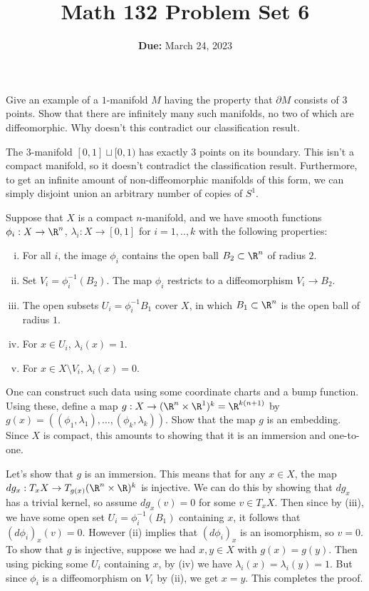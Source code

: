 \documentclass[11pt,letterpaper]{article}
\title{\textbf{Math 132 Problem Set 6}}
\date{\textbf{Due:} March 24, 2023}
\begin{document}
\maketitle

\begin{problem}
    Give an example of a $1$-manifold $M$ having the property that $\partial M$ consists of $3$ points. Show that there are infinitely many such manifolds, no two of which are diffeomorphic. Why doesn't this contradict our classification result.
\end{problem}

\begin{solution}
    \quad The $3$-manifold $[0,1]\sqcup [0, 1)$ has exactly $3$ points on its boundary. This isn't a compact manifold, so it doesn't contradict the classification result. Furthermore, to get an infinite amount of non-diffeomorphic manifolds of this form, we can simply disjoint union an arbitrary number of copies of $S^1$.
\end{solution}

\begin{problem}
    Suppose that $X$ is a compact $n$-manifold, and we have smooth functions $\phi_i : X \to \R^n$, $\lambda_i : X \to [0,1]$ for $i=1,..,k$ with the following properties:
    \begin{enumerate}[(i)]
        \item For all $i$, the image $\phi_i$ contains the open ball $B_2\subset \R^n$ of radius $2$.
        \item Set $V_i = \phi_i^{-1}(B_2)$. The map $\phi_i$ restricts to a diffeomorphism $V_i \to B_2$.
        \item The open subsets $U_i = \phi^{-1}_i B_1$ cover $X$, in which $B_1\subset \R^n$ is the open ball of radius $1$.
        \item For $x\in U_i$, $\lambda_i(x) = 1$.
        \item For $x\in X \setminus V_i$, $\lambda_i(x)=0$.
    \end{enumerate} 
    One can construct such data using some coordinate charts and a bump function. Using these, define a map $g : X \to (\R^n \times \R^1)^k = \R^{k(n+1)}$ by $g(x)=\left((\phi_1, \lambda_1),\ldots,(\phi_k, \lambda_k)\right)$. Show that the map $g$ is an embedding. Since $X$ is compact, this amounts to showing that it is an immersion and one-to-one.
\end{problem}

\begin{solution}
    \quad Let's show that $g$ is an immersion. This means that for any $x\in X$, the map $dg_x : T_xX \to T_{g(x)}(\R^n\times \R)^k$ is injective. We can do this by showing that $dg_x$ has a trivial kernel, so assume $dg_x(v) = 0$ for some $v\in T_xX$. Then since by (iii), we have some open set $U_i=\phi_i^{-1}(B_1)$ containing $x$, it follows that $(d\phi_i)_x(v)=0$. However (ii) implies that $(d\phi_i)_x$ is an isomorphism, so $v=0$. To show that $g$ is injective, suppose we had $x,y\in X$ with $g(x)=g(y)$. Then using picking some $U_i$ containing $x$, by (iv) we have $\lambda_i(x)=\lambda_i(y)=1$. But since $\phi_i$ is a diffeomorphism on $V_i$ by (ii), we get $x=y$. This completes the proof.
\end{solution}
\end{document}
